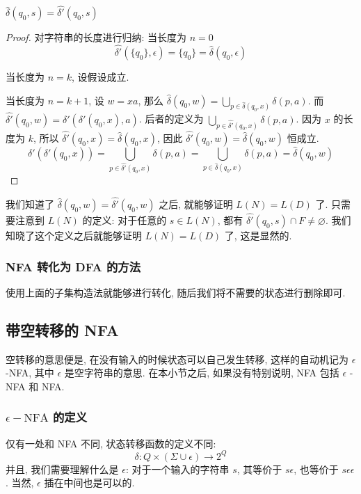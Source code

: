 \documentclass[../main_part1.tex]{subfiles}
\begin{document}
\begin{thm}
\( \hat{\delta}(q_{0},s) = \hat{\delta'}(q_{0}, s)\)
\end{thm}
\begin{proof}
对字符串的长度进行归纳:
当长度为 \(n=0\)
\begin{equation}
\hat{\delta'} (\{q_{0}\}, \epsilon ) = \{q_{0} \}  = \hat{\delta} (q_{0}, \epsilon) 
\end{equation}

当长度为 \(n = k\), 设假设成立.

当长度为 \(n  = k  + 1\), 设 \(w = x a \), 那么 \( \hat{\delta} (q_{0}, w ) = \bigcup_{p \in \hat{\delta} (q_{0}, x) } \delta (p, a)\). 
而 \( \hat{\delta'} (q_{0}, w) = \delta'  (\delta' (q_{0}, x), a)\). 后者的定义为 \(\bigcup_{p \in \hat{\delta'}(q_{0}, x)} \delta(p, a)\). 
因为 \(x\) 的长度为 \(k\), 所以 \( \hat{\delta' } (q_{0}, x) = \hat{\delta} (q_{0}, x)\), 因此 \( \hat{\delta ' } (q_{0}, w) = \hat{\delta} (q_{0}, w) \) 恒成立. 
\begin{equation}
\delta ' (\delta' (q_{0}, x)) = \bigcup_{p \in \hat{\delta'} (q_{0}, x )} 
\delta (p, a ) = \bigcup_{p \in \hat{\delta} (q _{0}, x) } \delta (p, a ) = \hat{\delta} (q_{0}, w) 
\end{equation}
\end{proof}
我们知道了 \( \hat{\delta} (q_{0}, w )  = \hat{\delta ' } (q_{0}, w )\) 之后, 就能够证明 \(L (N) = L(D)\) 了. 只需要注意到 \(L (N)\) 的定义: 对于任意的 \(s \in L (N)\), 都有 \( \hat{\delta' } (q_{0}, s) \cap F \ne \varnothing \). 我们知晓了这个定义之后就能够证明 \(L (N) = L (D)\) 了, 这是显然的. 

\subsubsection{NFA 转化为 DFA 的方法}
使用上面的子集构造法就能够进行转化, 随后我们将不需要的状态进行删除即可. 
\subsection{带空转移的 NFA}
空转移的意思便是, 在没有输入的时候状态可以自己发生转移, 这样的自动机记为 \(\epsilon\)-NFA, 其中 \(\epsilon\) 是空字符串的意思. 在本小节之后, 如果没有特别说明, NFA 包括 \(\epsilon\) - NFA 和 NFA. 
\subsubsection{\(\epsilon-\text{NFA}\) 的定义}
仅有一处和 NFA 不同, 状态转移函数的定义不同: 
\begin{equation}
\delta \colon Q \times (\Sigma \cup \epsilon ) \to 2 ^{Q}
\end{equation}
并且, 我们需要理解什么是 \(\epsilon\): 对于一个输入的字符串 \(s\), 其等价于 \(s\epsilon\), 也等价于 \(s\epsilon\epsilon\). 当然, \(\epsilon\) 插在中间也是可以的.
\end{document}
